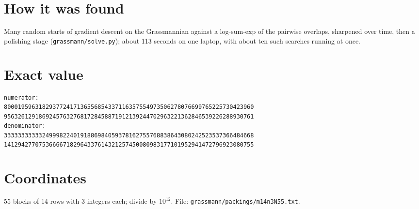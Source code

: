 \documentclass[11pt,a4paper]{article}
\begin{document}
\section{How it was found}
Many random starts of gradient descent on the Grassmannian against a log-sum-exp of the pairwise overlaps, sharpened over time, then a polishing stage (\texttt{grassmann/solve.py}); about 113 seconds on one laptop, with about ten such searches running at once.


\appendix
\section{Exact value}
{\small
\begin{verbatim}
numerator:
800019596318293772417136556854337116357554973506278076699765225730423960
956326129186924576327681728458871912139244702963221362846539226288930761
denominator:
333333333332499982240191886984059378162755768838643080242523537366484668
141294277075366667182964337614321257450080983177101952941472796923080755
\end{verbatim}}

\section{Coordinates}
55 blocks of 14 rows with 3 integers each; divide by $10^{12}$. File: \texttt{grassmann/packings/m14n3N55.txt}.
{\tiny
\begin{multicols}{3}
\end{multicols}}
\end{document}

